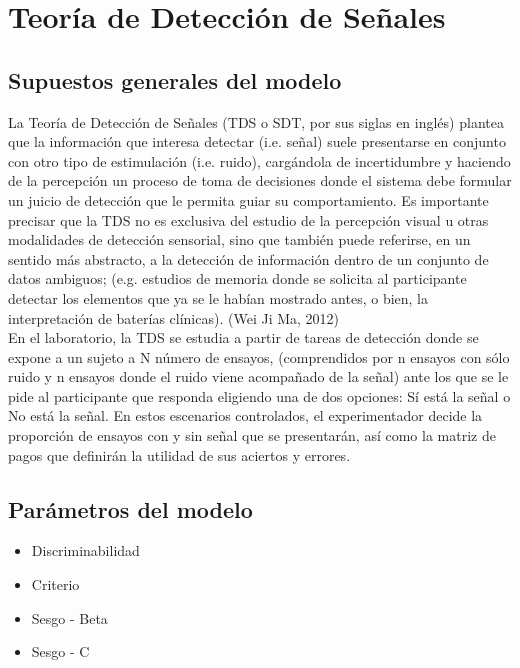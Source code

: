 \section{Teoría de Detección de Señales}

\subsection{Supuestos generales del modelo}

La Teoría de Detección de Señales (TDS o SDT, por sus siglas en inglés) plantea que la información que  interesa  detectar  (i.e. señal)  suele  presentarse  en  conjunto  con  otro  tipo  de  estimulación (i.e. ruido),  cargándola  de  incertidumbre  y  haciendo de  la  percepción  un  proceso  de  toma  de decisiones  donde  el  sistema  debe  formular  un  juicio  de  detección que  le  permita  guiar  su comportamiento. Es importante precisar  que la TDS no es exclusiva del estudio de la percepción visual  u  otras  modalidades  de  detección  sensorial,  sino  que  también  puede  referirse,  en  un sentido más abstracto, a la detección de información dentro de un conjunto de datos ambiguos; (e.g.  estudios  de  memoria  donde  se  solicita  al  participante  detectar  los  elementos  que  ya  se  le habían mostrado antes, o bien, la interpretación de baterías clínicas). (Wei Ji Ma, 2012)\\

En el laboratorio, la  TDS se estudia a partir  de tareas de detección donde se expone a un  sujeto  a  N  número  de  ensayos,  (comprendidos  por  n  ensayos con  sólo  ruido  y  n  ensayos donde  el  ruido  viene  acompañado  de  la  señal)  ante  los  que  se  le  pide  al  participante  que responda eligiendo una de dos opciones: Sí está la señal o No está la señal. En estos escenarios controlados,  el  experimentador  decide  la  proporción  de  ensayos  con  y  sin  señal  que  se presentarán, así como la matriz de pagos que definirán la utilidad de sus aciertos y errores. \\

\subsection{Parámetros del modelo}


\begin{itemize}
\item Discriminabilidad
\item Criterio
\item Sesgo - Beta
\item Sesgo - C
\end{itemize}

